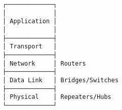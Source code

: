 \documentclass[varwidth,crop]{standalone}
\begin{document}
\begin{verbatim}
┌─────────────┐                 
│             │                 
│ Application │                 
│             │                 
├─────────────┤                 
│ Transport   │                 
├─────────────┤                 
│ Network     │ Routers          
├─────────────┤                 
│ Data Link   │ Bridges/Switches 
├─────────────┤                 
│ Physical    │ Repeaters/Hubs   
└─────────────┘                 
\end{verbatim}
\end{document}
